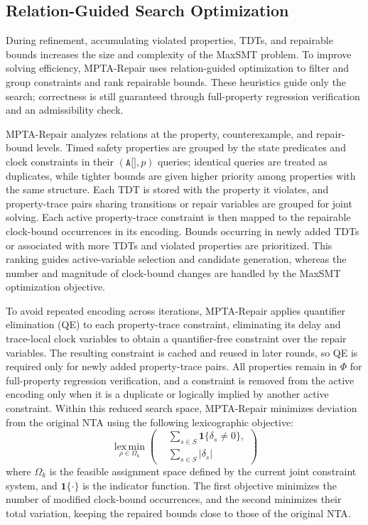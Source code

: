\subsection{Relation-Guided Search Optimization}

During refinement, accumulating violated properties, TDTs, and
repairable bounds increases the size and complexity of the MaxSMT
problem. To improve solving efficiency, MPTA-Repair uses
relation-guided optimization to filter and group constraints and rank
repairable bounds. These heuristics guide only the search; correctness
is still guaranteed through full-property regression verification and an
admissibility check.

MPTA-Repair analyzes relations at the property, counterexample, and
repair-bound levels. Timed safety properties are grouped by the state
predicates and clock constraints in their $(\texttt{A[]},p)$ queries;
identical queries are treated as duplicates, while tighter bounds are
given higher priority among properties with the same structure. Each
TDT is stored with the property it violates, and property-trace pairs
sharing transitions or repair variables are grouped for joint solving.
Each active property-trace constraint is then mapped to the repairable
clock-bound occurrences in its encoding. Bounds occurring in newly
added TDTs or associated with more TDTs and violated properties are
prioritized. This ranking guides active-variable selection and
candidate generation, whereas the number and magnitude of clock-bound
changes are handled by the MaxSMT optimization objective.

To avoid repeated encoding across iterations, MPTA-Repair applies
quantifier elimination (QE) to each property-trace constraint,
eliminating its delay and trace-local clock variables to obtain a
quantifier-free constraint over the repair variables. The resulting
constraint is cached and reused in later rounds, so QE is required only
for newly added property-trace pairs. All properties remain in $\Phi$
for full-property regression verification, and a constraint is removed
from the active encoding only when it is a duplicate or logically
implied by another active constraint. Within this reduced search space,
MPTA-Repair minimizes deviation from the original NTA using the
following lexicographic objective:
\begin{equation}
\operatorname*{lex\,min}_{\rho\in\Omega_k}
\left(
\begin{aligned}
&\sum_{s\in S}\mathbf{1}\{\delta_s \ne 0\},\\
&\sum_{s\in S}|\delta_s|
\end{aligned}
\right)
\end{equation}
where $\Omega_k$ is the feasible assignment space defined by the current
joint constraint system, and $\mathbf{1}\{\cdot\}$ is the indicator
function. The first objective minimizes the number of modified
clock-bound occurrences, and the second minimizes their total variation,
keeping the repaired bounds close to those of the original NTA.
